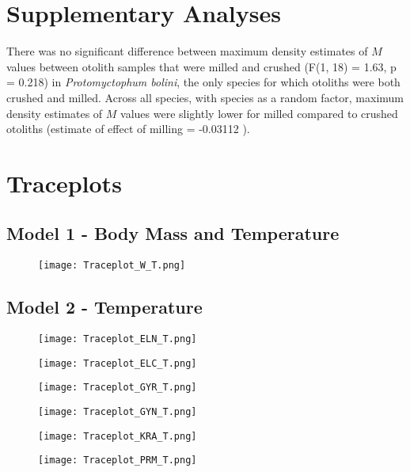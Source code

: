 \documentclass[12pt, titlepage]{article}
\begin{document}
\section{Supplementary Analyses}
\label{app:supp}

There was no significant difference between maximum density estimates of $M$ values between otolith samples that were milled and crushed (F(1, 18) = 1.63, p = 0.218) in \textit{Protomyctophum bolini}, the only species for which otoliths were both crushed and milled.
Across all species, with species as a random factor, maximum density estimates of $M$ values were slightly lower for milled compared to crushed otoliths (estimate of effect of milling = -0.03112 ).

\section{Traceplots}

\subsection{Model 1 - Body Mass and Temperature}
\begin{figure}[H]
\texttt{[image: Traceplot\_W\_T.png]}
\end{figure}

\subsection{Model 2 - Temperature}
\begin{figure}[H]
\texttt{[image: Traceplot\_ELN\_T.png]}
\end{figure}
\begin{figure}[H]
\texttt{[image: Traceplot\_ELC\_T.png]}
\end{figure}
\begin{figure}[H]
\texttt{[image: Traceplot\_GYR\_T.png]}
\end{figure}
\begin{figure}[H]
\texttt{[image: Traceplot\_GYN\_T.png]}
\end{figure}
\begin{figure}[H]
\texttt{[image: Traceplot\_KRA\_T.png]}
\end{figure}
\begin{figure}[H]
\texttt{[image: Traceplot\_PRM\_T.png]}
\end{figure}
\end{document}
